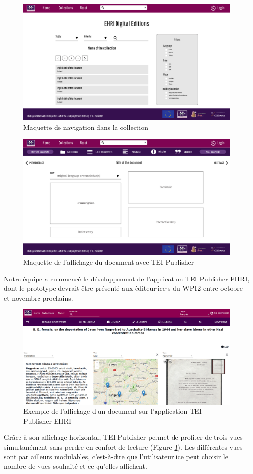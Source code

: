 \begin{figure}[h]
    \centering
    \includegraphics[width=0.55\linewidth]{2-MAIN/images/ehri-collection.png}
    \caption{Maquette de navigation dans la collection}
    \label{fig:ehri-collmaquette}
\end{figure}

\begin{figure}[h]
    \centering
    \includegraphics[width=0.55\linewidth]{2-MAIN/images/ehri-document.png}
    \caption{Maquette de l'affichage du document avec TEI Publisher}
    \label{fig:ehri-docmaquette}
\end{figure}

Notre équipe a commencé le développement de l'application TEI Publisher EHRI, dont le prototype devrait être présenté aux éditeur$\cdot$ice$\cdot$s du WP12 entre octobre et novembre prochains.

\begin{figure}[!h]
    \centering
    \includegraphics[width=1\linewidth]{2-MAIN/images/ehri-proofofconcept.png}
    \caption{Exemple de l'affichage d'un document sur l'application TEI Publisher EHRI}
    \label{fig:ehri-proofofconcept}
\end{figure}

Grâce à son affichage horizontal, TEI Publisher permet de profiter de trois vues simultanément sans perdre en confort de lecture (Figure \ref{fig:ehri-proofofconcept}). Les différentes vues sont par ailleurs modulables, c'est-à-dire que l'utilisateur$\cdot$ice peut choisir le nombre de vues souhaité et ce qu'elles affichent.